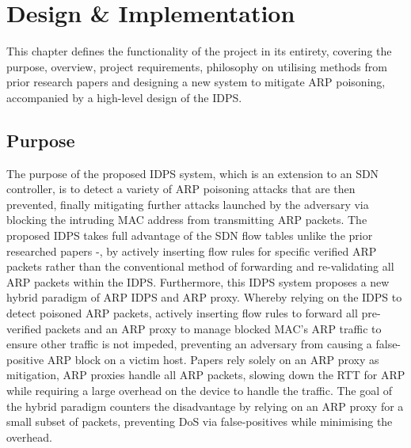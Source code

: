 \documentclass[12pt, oneside]{book}
\begin{document}


\chapter{Design \& Implementation}
\label{Chap:DesImp}
This chapter defines the functionality of the project in its entirety,
covering the purpose, overview, project requirements, philosophy on utilising methods from prior research papers
and designing a new system to mitigate
ARP poisoning, accompanied by a high-level design of the IDPS.

\section{Purpose}
The purpose of the proposed IDPS system, which is an extension to an SDN controller, is to detect a
variety of ARP poisoning attacks that are then prevented, finally mitigating further attacks
launched by the adversary via blocking the intruding MAC address from transmitting
ARP packets. The proposed IDPS takes full advantage of the SDN flow tables unlike the prior researched papers
\cite{alharbi2016securing}-\cite{abdelsalam2015mitigating}, by actively inserting flow rules for specific
verified ARP packets rather than the conventional method of forwarding and re-validating all ARP packets within the IDPS.
Furthermore, this IDPS system proposes a new hybrid paradigm of ARP IDPS and ARP proxy. Whereby relying on the IDPS 
to detect poisoned ARP packets, actively inserting 
flow rules to forward all pre-verified packets and an ARP proxy to manage blocked MAC's ARP traffic to ensure 
other traffic is not impeded, preventing an adversary from causing a false-positive ARP block on a victim host.
Papers \cite{alharbi2016securing}\cite{matties2017distributed} rely solely 
on an ARP proxy as mitigation, ARP proxies handle all ARP packets, slowing 
down the RTT for ARP while requiring a large overhead on the device to handle the traffic.
The goal of the hybrid paradigm counters the disadvantage by
relying on an ARP proxy for a small subset of packets, preventing DoS via false-positives  while minimising the overhead.
\end{document}
